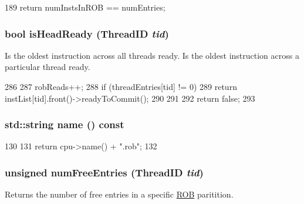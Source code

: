 \begin{DoxyCode}
189     { return numInstsInROB == numEntries; }
\end{DoxyCode}
\hypertarget{classROB_aafcd2d518fa9f1e1b1e4c166804ea0ce}{
\subsubsection[{isHeadReady}]{\setlength{\rightskip}{0pt plus 5cm}bool isHeadReady ({\bf ThreadID} {\em tid})}}
\label{classROB_aafcd2d518fa9f1e1b1e4c166804ea0ce}
Is the oldest instruction across all threads ready. Is the oldest instruction across a particular thread ready. 


\begin{DoxyCode}
286 {
287     robReads++;
288     if (threadEntries[tid] != 0) {
289         return instList[tid].front()->readyToCommit();
290     }
291 
292     return false;
293 }
\end{DoxyCode}
\hypertarget{classROB_a37627d5d5bba7f4a8690c71c2ab3cb07}{
\subsubsection[{name}]{\setlength{\rightskip}{0pt plus 5cm}std::string name () const}}
\label{classROB_a37627d5d5bba7f4a8690c71c2ab3cb07}



\begin{DoxyCode}
130 {
131     return cpu->name() + ".rob";
132 }
\end{DoxyCode}
\hypertarget{classROB_acc878f608deead5b5319a6a3f98b50c8}{
\subsubsection[{numFreeEntries}]{\setlength{\rightskip}{0pt plus 5cm}unsigned numFreeEntries ({\bf ThreadID} {\em tid})}}
\label{classROB_acc878f608deead5b5319a6a3f98b50c8}
Returns the number of free entries in a specific \hyperlink{classROB}{ROB} paritition. 


